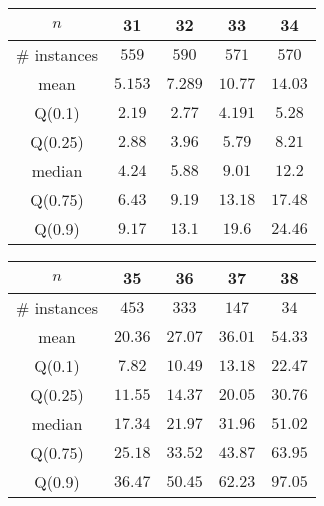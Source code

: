 \begin{tabular}{c|cccc} 
\hline 
$n$ & 31 & 32 & 33 & 34 \tabularnewline 
\hline 
\hline 
\# instances & $559$ & $590$ & $571$ & $570$ \tabularnewline 
mean & $5.153$ & $7.289$ & $10.77$ & $14.03$ \tabularnewline 
Q(0.1) & $2.19$ & $2.77$ & $4.191$ & $5.28$ \tabularnewline 
Q(0.25) & $2.88$ & $3.96$ & $5.79$ & $8.21$ \tabularnewline 
median & $4.24$ & $5.88$ & $9.01$ & $12.2$ \tabularnewline 
Q(0.75) & $6.43$ & $9.19$ & $13.18$ & $17.48$ \tabularnewline 
Q(0.9) & $9.17$ & $13.1$ & $19.6$ & $24.46$ \tabularnewline 
\hline 
\end{tabular} 
\medskip{} 

\begin{tabular}{c|cccc} 
\hline 
$n$ & 35 & 36 & 37 & 38 \tabularnewline 
\hline 
\hline 
\# instances & $453$ & $333$ & $147$ & $34$ \tabularnewline 
mean & $20.36$ & $27.07$ & $36.01$ & $54.33$ \tabularnewline 
Q(0.1) & $7.82$ & $10.49$ & $13.18$ & $22.47$ \tabularnewline 
Q(0.25) & $11.55$ & $14.37$ & $20.05$ & $30.76$ \tabularnewline 
median & $17.34$ & $21.97$ & $31.96$ & $51.02$ \tabularnewline 
Q(0.75) & $25.18$ & $33.52$ & $43.87$ & $63.95$ \tabularnewline 
Q(0.9) & $36.47$ & $50.45$ & $62.23$ & $97.05$ \tabularnewline 
\hline 
\end{tabular} 
\medskip{} 

